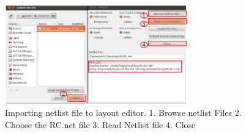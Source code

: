 \begin{figure}
\centering
\includegraphics[width=0.7\textwidth]{figures/brnet}
\caption{Importing netlist file to layout editor. 1. Browse netlist Files 2. Choose the RC.net file 3. Read Netlist file 4. Close}
\label{brnet}
\end{figure}

